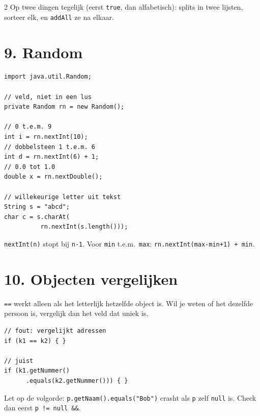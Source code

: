 \documentclass[12pt,a4paper]{extarticle}
\begin{document}
\begin{multicols}{2}
    Op twee dingen tegelijk (eerst \texttt{true}, dan alfabetisch): splits in twee
    lijsten, sorteer elk, en \texttt{addAll} ze na elkaar.

    \section{9. Random}
    \begin{lstlisting}
import java.util.Random;

// veld, niet in een lus
private Random rn = new Random();

// 0 t.e.m. 9
int i = rn.nextInt(10);
// dobbelsteen 1 t.e.m. 6
int d = rn.nextInt(6) + 1;
// 0.0 tot 1.0
double x = rn.nextDouble();

// willekeurige letter uit tekst
String s = "abcd";
char c = s.charAt(
          rn.nextInt(s.length()));
\end{lstlisting}
    \texttt{nextInt(n)} stopt bij \texttt{n-1}. Voor \texttt{min} t.e.m.\
    \texttt{max}: \texttt{rn.nextInt(max-min+1) + min}.

    \section{10. Objecten vergelijken}
    \texttt{==} werkt alleen als het letterlijk hetzelfde object is. Wil je weten of
    het dezelfde persoon is, vergelijk dan het veld dat uniek is.
    \begin{lstlisting}
// fout: vergelijkt adressen
if (k1 == k2) { }

// juist
if (k1.getNummer()
      .equals(k2.getNummer())) { }
\end{lstlisting}
    Let op de volgorde: \texttt{p.getNaam().equals("Bob")} crasht als \texttt{p}
    zelf \texttt{null} is. Check dan eerst \texttt{p != null \&\&}.


\end{multicols}
\end{document}
